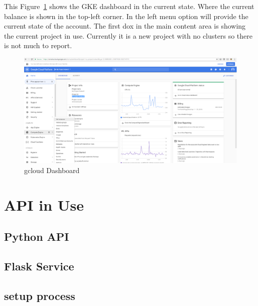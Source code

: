 This Figure~\ref{fig:gcloud-dashboard} shows the GKE dashboard in the current 
state. Where the current 
balance is shown in the top-left corner. In the left menu option will provide 
the current state of the account. The first dox in the main content area is 
showing the current project in use. Currently it is a new project with no
 clusters so there is not much to report.
 
 \begin{figure}[htb]
   \centering\includegraphics[width=\columnwidth]{images/hid_417_gcloud_browser.png}
   \caption{gcloud Dashboard}\label{fig:gcloud-dashboard}
 \end{figure}

 \section{API in Use}


\subsection{Python API}


\subsection{Flask Service}


\subsection{setup process}


